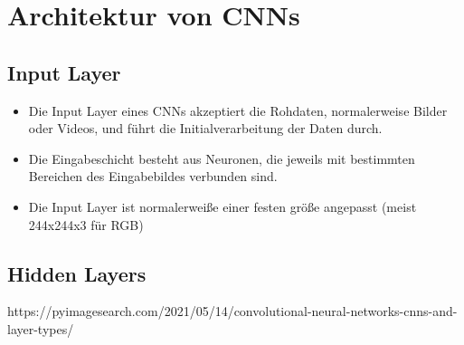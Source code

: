 \section{Architektur von CNNs}

\subsection{Input Layer}
\begin{itemize}
  \item Die Input Layer eines CNNs akzeptiert die Rohdaten, normalerweise Bilder oder Videos, und führt die Initialverarbeitung der Daten durch.
  \item Die Eingabeschicht besteht aus Neuronen, die jeweils mit bestimmten Bereichen des Eingabebildes verbunden sind.
  \item Die Input Layer ist normalerweiße einer festen größe angepasst (meist 244x244x3 für RGB)
\end{itemize}

\subsection{Hidden Layers}

https://pyimagesearch.com/2021/05/14/convolutional-neural-networks-cnns-and-layer-types/


